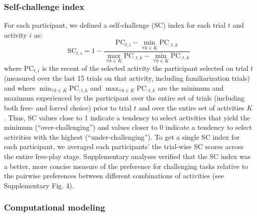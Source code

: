     \subsubsection*{Self-challenge index}\label{subsubsec:methods/analysis/sc}
    For each participant, we defined a self-challenge (SC) index for each trial $t$ and activity $i$ as: 
    \begin{equation}\label{eq:sc}
        \text{SC}_{t,i} = 1-\frac{\text{PC}_{t,i}-\min\limits_{\forall k \in K}\text{PC}_{:t,k}}{\max\limits_{\forall k \in K}\text{PC}_{:t,k}-\min\limits_{\forall k \in K}\text{PC}_{:t,k}}
    \end{equation}
    where $\text{PC}_{t,i}$ is the recent {\PC} of the selected activity the participant selected on trial $t$ (measured over the last 15 trials on that activity, including familiarization trials) and where $\min\nolimits_{\forall k \in K}\text{PC}_{:t,k}$ and $\max\nolimits_{\forall k \in K}\text{PC}_{:t,k}$ are the minimum and maximum {\PC} experienced by the participant over the entire set of trials (including both free- and forced choice) prior to trial $t$ and over the entire set of activities $K$. Thus, SC values close to 1 indicate a tendency to select activities that yield the minimum {\PC} (“over-challenging”) and values closer to 0 indicate a tendency to select activities with the highest {\PC} (“under-challenging”). To get a single SC index for each participant, we averaged each participants' the trial-wise SC scores across the entire free-play stage. Supplementary analyses verified that the SC index was a better, more concise measure of the preference for challenging tasks relative to the pairwise preferences between different combinations of activities (see Supplementary Fig. 4). 
    
    \subsubsection*{Computational modeling}\label{subsubsec:methods/analysis/modeling} 
    
